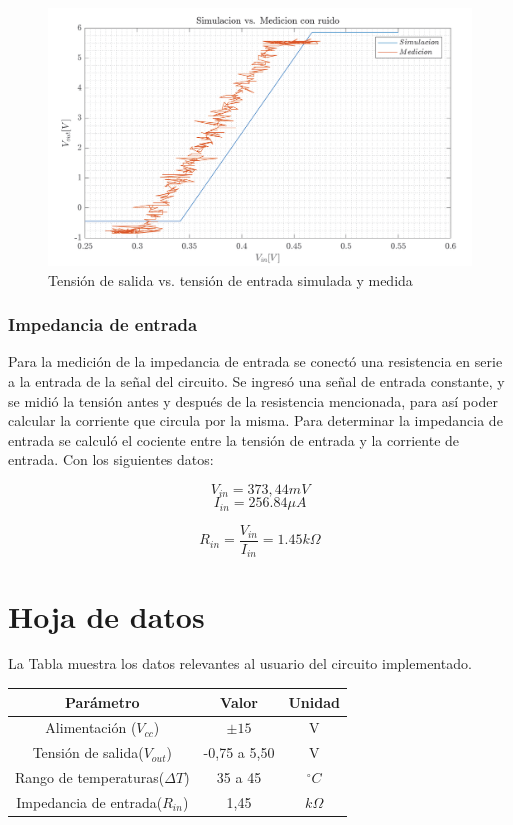 \begin{figure}[H]
\centering
\includegraphics[scale=0.4]{../parte6/Informe/resources/grafica_contraste_ruido.png}
\caption{Tensión de salida vs. tensión de entrada simulada y medida}
\label{6_output}
\end{figure}

\subsubsection{Impedancia de entrada}
Para la medición de la impedancia de entrada se conectó una resistencia en serie a la entrada de la señal del circuito. Se ingresó una señal de entrada constante, y se midió la tensión antes y después de la resistencia mencionada, para así poder calcular la corriente que circula por la misma. Para determinar la impedancia de entrada se calculó el cociente entre la tensión de entrada y la corriente de entrada. 
Con los siguientes datos:

\[V_{in} = 373,44mV\]
\[I_{in} = 256.84\mu A\]

\[R_{in} = \frac{V_{in}}{I_{in}} = 1.45k\Omega\]


\section{Hoja de datos}
La Tabla muestra los datos relevantes al usuario del circuito implementado.

\begin{center}
\begin{tabular}{|c|c|c|}
\hline 
Parámetro & Valor & Unidad \\ 
\hline 
Alimentación ($V_{cc}$) & $\pm 15$ & V \\ 
\hline 
Tensión de salida($V_{out}$) & -0,75 a 5,50 & V \\ 
\hline 
Rango de temperaturas($\Delta T$) & 35 a 45 & $^\circ C$ \\ 
\hline 
Impedancia de entrada($R_{in}$) & 1,45 & $k\Omega$ \\ 
\hline 
\end{tabular} 
\end{center}

